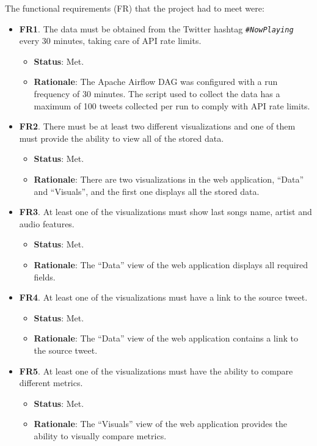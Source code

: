 \nonzeroparskip The functional requirements (FR) that the project had to meet were:
\begin{itemize}
	\item \textbf{FR1}. The data must be obtained from the Twitter hashtag \texttt{\textit{\#NowPlaying}} every 30 minutes, taking care of API rate limits.
	\begin{itemize}
		\item \textbf{Status}: Met.
		\item \textbf{Rationale}: The Apache Airflow DAG was configured with a run frequency of 30 minutes. The script used to collect the data has a maximum of 100 tweets collected per run to comply with API rate limits.
	\end{itemize}
	\item \textbf{FR2}. There must be at least two different visualizations and one of them must provide the ability to view all of the stored data.
	\begin{itemize}
		\item \textbf{Status}: Met.
		\item \textbf{Rationale}: There are two visualizations in the web application, ``Data'' and ``Visuals'', and the first one displays all the stored data.
	\end{itemize}
	\item \textbf{FR3}. At least one of the visualizations must show last songs name, artist and audio features.
	\begin{itemize}
		\item \textbf{Status}: Met.
		\item \textbf{Rationale}: The ``Data'' view of the web application displays all required fields.
	\end{itemize}
	\item \textbf{FR4}. At least one of the visualizations must have a link to the source tweet.
	\begin{itemize}
		\item \textbf{Status}: Met.
		\item \textbf{Rationale}: The ``Data'' view of the web application contains a link to the source tweet.
	\end{itemize}
	\item \textbf{FR5}. At least one of the visualizations must have the ability to compare different metrics.
	\begin{itemize}
		\item \textbf{Status}: Met.
		\item \textbf{Rationale}: The ``Visuals'' view of the web application provides the ability to visually compare metrics.

\end{itemize}
\end{itemize}
